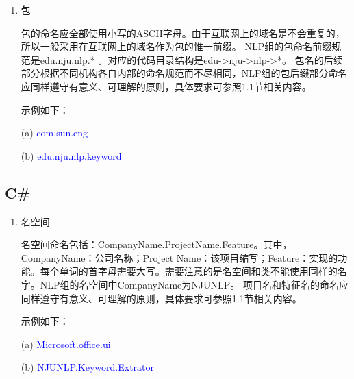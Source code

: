 \begin{enumerate}
\item 包

包的命名应全部使用小写的ASCII字母。由于互联网上的域名是不会重复的，所以一般采用在互联网上的域名作为包的惟一前缀。
NLP组的包命名前缀规范是edu.nju.nlp.* 。对应的代码目录结构是edu->nju->nlp->*。
包名的后续部分根据不同机构各自内部的命名规范而不尽相同，NLP组的包后缀部分命名应同样遵守有意义、可理解的原则，具体要求可参照1.1节相关内容。

示例如下：

(a) \textcolor{blue}{com.sun.eng }  

(b) \textcolor{blue}{edu.nju.nlp.keyword}
\end{enumerate}

\subsection{C\#}

\begin{enumerate}
\item 名空间

名空间命名包括：CompanyName.ProjectName.Feature。其中，CompanyName：公司名称；Project Name：该项目缩写；Feature：实现的功能。每个单词的首字母需要大写。需要注意的是名空间和类不能使用同样的名字。NLP组的名空间中CompanyName为NJUNLP。
项目名和特征名的命名应同样遵守有意义、可理解的原则，具体要求可参照1.1节相关内容。

示例如下：

(a) \textcolor{blue}{Microsoft.office.ui}

(b) \textcolor{blue}{NJUNLP.Keyword.Extrator}
\end{enumerate}
